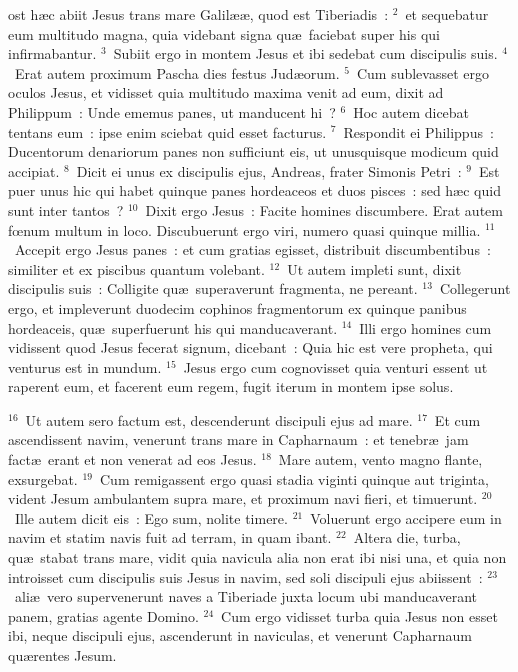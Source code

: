\bchapter
{}ost h\ae c abiit Jesus trans mare Galil\ae \ae , quod est Tiberiadis~:
${}^{2}$~et sequebatur eum multitudo magna, quia videbant signa qu\ae\ faciebat super his qui infirmabantur.
${}^{3}$~Subiit ergo in montem Jesus et ibi sedebat cum discipulis suis.
${}^{4}$~Erat autem proximum Pascha dies festus Jud\ae orum.
${}^{5}$~Cum sublevasset ergo oculos Jesus, et vidisset quia multitudo maxima venit ad eum, dixit ad Philippum~: Unde ememus panes, ut manducent hi~?
${}^{6}$~Hoc autem dicebat tentans eum~: ipse enim sciebat quid esset facturus.
${}^{7}$~Respondit ei Philippus~: Ducentorum denariorum panes non sufficiunt eis, ut unusquisque modicum quid accipiat.
${}^{8}$~Dicit ei unus ex discipulis ejus, Andreas, frater Simonis Petri~:
${}^{9}$~Est puer unus hic qui habet quinque panes hordeaceos et duos pisces~: sed h\ae c quid sunt inter tantos~?
${}^{10}$~Dixit ergo Jesus~: Facite homines discumbere. Erat autem fœnum multum in loco. Discubuerunt ergo viri, numero quasi quinque millia.
${}^{11}$~Accepit ergo Jesus panes~: et cum gratias egisset, distribuit discumbentibus~: similiter et ex piscibus quantum volebant.
${}^{12}$~Ut autem impleti sunt, dixit discipulis suis~: Colligite qu\ae\ superaverunt fragmenta, ne pereant.
${}^{13}$~Collegerunt ergo, et impleverunt duodecim cophinos fragmentorum ex quinque panibus hordeaceis, qu\ae\ superfuerunt his qui manducaverant.
${}^{14}$~Illi ergo homines cum vidissent quod Jesus fecerat signum, dicebant~: Quia hic est vere propheta, qui venturus est in mundum.
${}^{15}$~Jesus ergo cum cognovisset quia venturi essent ut raperent eum, et facerent eum regem, fugit iterum in montem ipse solus.


${}^{16}$~Ut autem sero factum est, descenderunt discipuli ejus ad mare.
${}^{17}$~Et cum ascendissent navim, venerunt trans mare in Capharnaum~: et tenebr\ae\ jam fact\ae\ erant et non venerat ad eos Jesus.
${}^{18}$~Mare autem, vento magno flante, exsurgebat.
${}^{19}$~Cum remigassent ergo quasi stadia viginti quinque aut triginta, vident Jesum ambulantem supra mare, et proximum navi fieri, et timuerunt.
${}^{20}$~Ille autem dicit eis~: Ego sum, nolite timere.
${}^{21}$~Voluerunt ergo accipere eum in navim et statim navis fuit ad terram, in quam ibant.
${}^{22}$~Altera die, turba, qu\ae\ stabat trans mare, vidit quia navicula alia non erat ibi nisi una, et quia non introisset cum discipulis suis Jesus in navim, sed soli discipuli ejus abiissent~:
${}^{23}$~ali\ae\ vero supervenerunt naves a Tiberiade juxta locum ubi manducaverant panem, gratias agente Domino.
${}^{24}$~Cum ergo vidisset turba quia Jesus non esset ibi, neque discipuli ejus, ascenderunt in naviculas, et venerunt Capharnaum qu\ae rentes Jesum.


